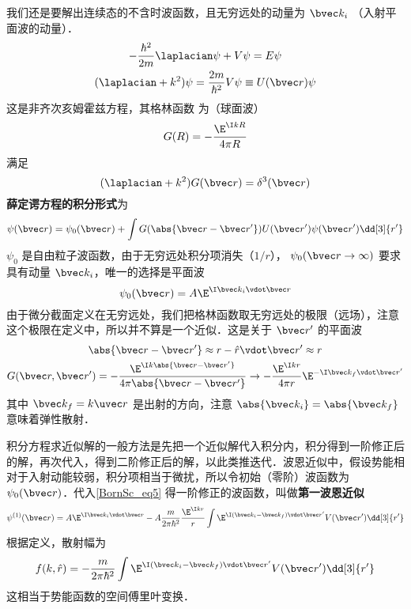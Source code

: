 

我们还是要解出连续态的不含时波函数，且无穷远处的动量为 $\bvec k_i$ （入射平面波的动量）．
\begin{gather}
-\frac{\hbar^2}{2m} \laplacian\psi  + V\psi  = E\psi \\
(\laplacian + k^2)\psi  = \frac{2m}{\hbar^2} V\psi  \equiv U(\bvec r)\psi
\end{gather}
这是非齐次亥姆霍兹方程，其格林函数%
为（球面波）
\begin{equation}
G(R) =  -\frac{\E^{\I kR}}{4\pi R}
\end{equation}
满足
\begin{equation}
(\laplacian + k^2)G(\bvec r) = \delta^3(\bvec r)
\end{equation}
\textbf{薛定谔方程的积分形式}为
\begin{equation}\label{BornSc_eq5}
\psi(\bvec r) = \psi_0(\bvec r) + \int G(\abs{\bvec r - \bvec r'})U(\bvec r')\psi (\bvec r') \dd[3]{r'}
\end{equation}
$\psi_0$ 是自由粒子波函数，由于无穷远处积分项消失（$1/r$）， $\psi_0(\bvec r\to\infty)$ 要求具有动量 $\bvec k_i$，唯一的选择是平面波
\begin{equation}
\psi_0(\bvec r) = A\E^{\I\bvec k_i \vdot \bvec r}
\end{equation}
由于微分截面定义在无穷远处，我们把格林函数取无穷远处的极限（远场），注意这个极限在定义中，所以并不算是一个近似．这是关于 $\bvec r'$ 的平面波
\begin{gather}
\abs{\bvec r - \bvec r'} \approx r - \hat r \vdot \bvec r' \approx r\\
G(\bvec r, \bvec r') =  - \frac{\E^{\I k \abs{\bvec r - \bvec r'}}}{4\pi\abs{\bvec r - \bvec r'}} \to  - \frac{\E^{\I kr}}{4\pi r} \E^{-\I \bvec k_f \vdot \bvec r'}
\end{gather}
其中 $\bvec k_f = k\uvec r$ 是出射的方向，注意 $\abs{\bvec k_i} = \abs{\bvec k_f}$ 意味着弹性散射．

积分方程求近似解的一般方法是先把一个近似解代入积分内，积分得到一阶修正后的解，再次代入，得到二阶修正后的解，以此类推迭代．波恩近似中，假设势能相对于入射动能较弱，积分项相当于微扰，所以令初始（零阶）波函数为 $\psi_0(\bvec r)$．代入\autoref{BornSc_eq5} 得一阶修正的波函数，叫做\textbf{第一波恩近似}
\begin{equation}
\psi ^{(1)}(\bvec r) = A\E^{\I\bvec k_i \vdot \bvec r} - A \frac{m}{2\pi\hbar^2} \frac{\E^{\I kr}}{r}\int \E^{\I (\bvec k_i - \bvec k_f) \vdot \bvec r'} V(\bvec r') \dd[3]{r'}
\end{equation}
根据定义，散射幅为
\begin{equation}
f(k, \hat r) =  - \frac{m}{2\pi\hbar^2} \int \E^{\I (\bvec k_i - \bvec k_f) \vdot \bvec r'} V(\bvec r') \dd[3]{r'}
\end{equation}
这相当于势能函数的空间傅里叶变换．

